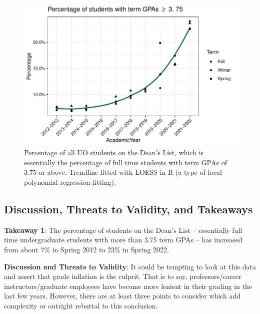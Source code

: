 \documentclass[10]{article}
\begin{document}
\begin{figure}[H]
	\centering
	\includegraphics[width=\linewidth]{../visualizations/grade-inflation}
	\caption[Grade Inflation]{Percentage of all UO students on the Dean's List, which is essentially the percentage of full time students with term GPAs of 3.75 or above. Trendline fitted with LOESS in R (a type of local polynomial regression fitting).}
	\label{fig:grade-inflation}
\end{figure}


\subsection{Discussion, Threats to Validity, and Takeaways}

\textbf{Takeaway 1}: The percentage of students on the Dean's List -- essentially full time undergraduate students with more than 3.75 term GPAs -- has increased from about 7\% in Spring 2012 to 23\% in Spring 2022.

\textbf{Discussion and Threats to Validity}: It could be tempting to look at this data and assert that grade inflation is the culprit. That is to say, professors/career instructors/graduate employees have become more lenient in their grading in the last few years. However, there are at least three points to consider which add complexity or outright rebuttal to this conclusion.
\end{document}
